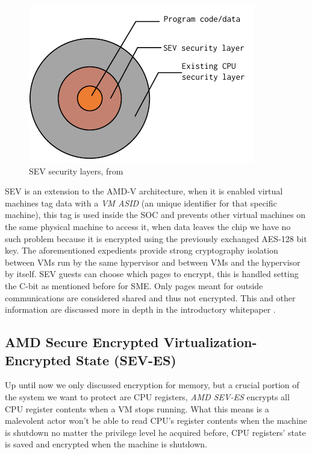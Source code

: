 \documentclass[twocolumn]{article}
\begin{document}
\begin{figure}
    \centering
    \includegraphics[scale=0.9]{img/security-layers.pdf}
    \caption{SEV security layers, from \cite{memory-encryption}}
\end{figure}

SEV is an extension to the AMD-V architecture, when it is enabled virtual machines tag data with a \textit{VM ASID} (an unique identifier for that specific machine), this tag is used inside the SOC and prevents other virtual machines on the same physical machine to access it, when data leaves the chip we have no such problem because it is encrypted using the previously exchanged AES-128 bit key. The aforementioned expedients provide strong cryptography isolation between VMs run by the same hypervisor and between VMs and the hypervisor by itself. SEV guests can choose which pages to encrypt, this is handled setting the C-bit as mentioned before for SME. Only pages meant for outside communications are considered shared and thus not encrypted. This and other information are discussed more in depth in the introductory whitepaper \cite{memory-encryption}.

\subsection{AMD Secure Encrypted Virtualization-Encrypted State (SEV-ES)}

Up until now we only discussed encryption for memory, but a crucial portion of the system we want to protect are CPU registers, \textit{AMD SEV-ES} encrypts all CPU register contents when a VM stops running. What this means is a malevolent actor won't be able to read CPU's register contents when the machine is shutdown no matter the privilege level he acquired before, CPU registers' state is saved and encrypted when the machine is shutdown.
\end{document}
